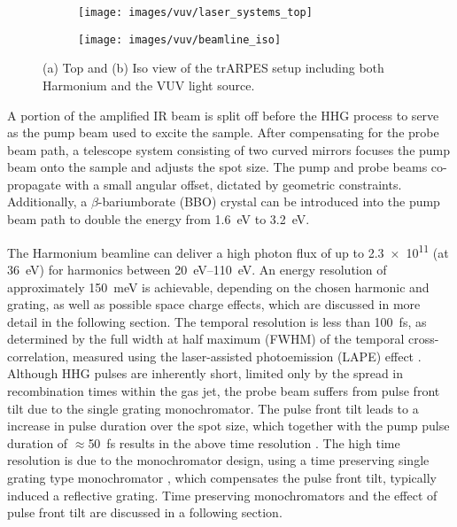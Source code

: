 \begin{figure}
	\centering
	\begin{subfigure}[b]{0.45\textwidth}
		\texttt{[image: images/vuv/laser\_systems\_top]}
		\caption{}
	\end{subfigure}
	\begin{subfigure}[b]{0.45\textwidth}
		\texttt{[image: images/vuv/beamline\_iso]}
		\caption{}
	\end{subfigure}
	\caption{(a) Top and (b) Iso view of the trARPES setup including both Harmonium and the VUV light source.}
	\label{fig:beamline_cad}
\end{figure}

A portion of the amplified IR beam is split off before the HHG process to serve as the pump beam used to excite the sample.
After compensating for the probe beam path, a telescope system consisting of two curved mirrors focuses the pump beam onto the sample and adjusts the spot size.
The pump and probe beams co-propagate with a small angular offset, dictated by geometric constraints.
Additionally, a $\beta$-bariumborate (BBO) crystal can be introduced into the pump beam path to double the energy from \qty{1.6}{\electronvolt} to \qty{3.2}{\electronvolt}.

The Harmonium beamline can deliver a high photon flux of up to \qty{2.3e11}{\pps} (at \qty{36}{\electronvolt}) for harmonics between \qtyrange{20}{110}{\electronvolt}.
An energy resolution of approximately \qty{150}{\milli\electronvolt} is achievable, depending on the chosen harmonic and grating, as well as possible space charge effects, which are discussed in more detail in the following section.
The temporal resolution is less than \qty{100}{\femto\second}, as determined by the full width at half maximum (FWHM) of the temporal cross-correlation, measured using the laser-assisted photoemission (LAPE) effect \cite{ojeda_harmonium_2015}.
Although HHG pulses are inherently short, limited only by the spread in recombination times within the gas jet, the probe beam suffers from pulse front tilt due to the single grating monochromator.
The pulse front tilt leads to a increase in pulse duration over the spot size, which together with the pump pulse duration of $\approx$\qty{50}{\femto\second} results in the above time resolution \cite{arrell_harmonium_2017}.
The high time resolution is due to the monochromator design, using a time preserving single grating type monochromator \cite{poletto_time-preserving_2010}, which compensates the pulse front tilt, typically induced a reflective grating.
Time preserving monochromators and the effect of pulse front tilt are discussed in a following section.

